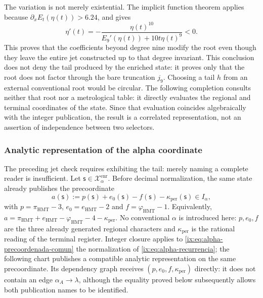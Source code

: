 The variation is not merely existential. The implicit function theorem
applies because \(\partial_xE_t(\eta(t))>6.24\), and gives
\begin{equation}
 \eta'(t)=-
 \frac{\eta(t)^{10}}
 {E_9'(\eta(t))+10t\eta(t)^9}<0.
 \label{ix:eq:alpha-variacion-raiz-prolongacion}
\end{equation}
This proves that the coefficients beyond degree nine modify
the root even though they leave the entire jet constructed up to that degree invariant.
This conclusion does not deny the tail produced by the enriched state: it proves
only that the root does not factor through the bare truncation
\(j_9\). Choosing a tail \(h\) from an external conventional root
would be circular. The following completion consults neither that root nor a metrological
table: it directly evaluates the regional and terminal coordinates of the
state. Since that evaluation coincides algebraically with the integer
publication, the result is a correlated representation, not an assertion
of independence between two selectors.


\subsubsection{Analytic representation of the alpha coordinate}
\label{ix:subsec:alpha-lector-completo-rev08}

The preceding jet check requires exhibiting the tail: merely naming a
complete reader is insufficient. Let \(\mathsf s\in\mathcal X_\alpha^{\mathrm{enr}}\). Before
decimal normalization, the same state already publishes the precoordinate
\begin{equation}
 a(\mathsf s):=p(\mathsf s)+e_0(\mathsf s)-f(\mathsf s)
                 -\kappa_{\mathrm{per}}(\mathsf s)\in I_\alpha,
 \label{ix:eq:alpha-precoordenada-comun}
\end{equation}
with \(p=\pi_{\mathrm{HMT}}-3\),
\(e_0=e_{\mathrm{HMT}}-2\) and
\(f=\varphi_{\mathrm{HMT}}-1\). Equivalently,
\(a=\pi_{\mathrm{HMT}}+e_{\mathrm{HMT}}-
\varphi_{\mathrm{HMT}}-4-\kappa_{\mathrm{per}}\). No conventional
\(\alpha\) is introduced here: \(p,e_0,f\) are the three already
generated regional characters and \(\kappa_{\mathrm{per}}\) is the rational reading of the
terminal register. Integer closure applies to
\eqref{ix:eq:alpha-precoordenada-comun} the normalization of
\eqref{ix:eq:alpha-recurrencia}; the following chart publishes a compatible analytic
representation on the same precoordinate. Its dependency
graph receives \((p,e_0,f,\kappa_{\mathrm{per}})\) directly: it does not
contain an edge \(\alpha_A\to\lambda\), although the equality proved
below subsequently allows both publication names to be identified.

